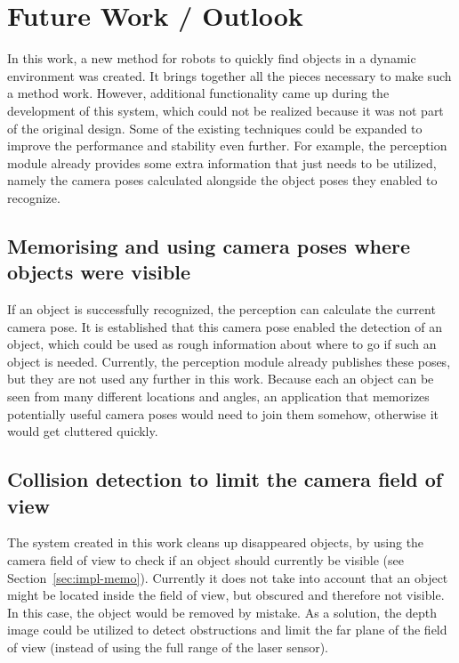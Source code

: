 \chapter{Future Work / Outlook}
In this work, a new method for robots to quickly find objects in a dynamic environment was created. It brings together all the pieces necessary to make such a method work. However, additional functionality came up during the development of this system, which could not be realized because it was not part of the original design. Some of the existing techniques could be expanded to improve the performance and stability even further. For example, the perception module already provides some extra information that just needs to be utilized, namely the camera poses calculated alongside the object poses they enabled to recognize.

\section*{Memorising and using camera poses where objects were visible}
If an object is successfully recognized, the perception can calculate the current camera pose. It is established that this camera pose enabled the detection of an object, which could be used as rough information about where to go if such an object is needed. Currently, the perception module already publishes these poses, but they are not used any further in this work. Because each an object can be seen from many different locations and angles, an application that memorizes potentially useful camera poses would need to join them somehow, otherwise it would get cluttered quickly.

\section*{Collision detection to limit the camera field of view}
The system created in this work cleans up disappeared objects, by using the camera field of view to check if an object should currently be visible (see Section~\ref{sec:impl-memo}). Currently it does not take into account that an object might be located inside the field of view, but obscured and therefore not visible. In this case, the object would be removed by mistake. As a solution, the depth image could be utilized to detect obstructions and limit the far plane of the field of view (instead of using the full range of the laser sensor).


